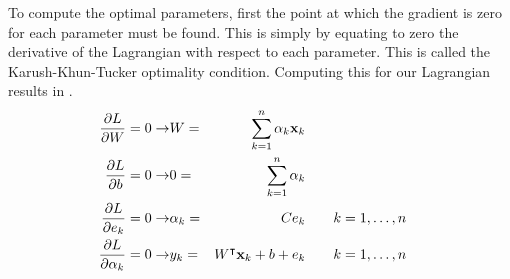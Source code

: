 To compute the optimal parameters, first the point at which the gradient is zero for each parameter must be found. This is simply by equating to zero the derivative of the Lagrangian with respect to each parameter. This is called the Karush-Khun-Tucker optimality condition. Computing this for our Lagrangian results in .
\begin{equation}
  \begin{split}
    \pdv{L}{W} = 0 \rightarrow          & W           = & \sum_{k=1}^{n}\alpha_{k}\vb{x}_{k}                      \\
    \pdv{L}{b} = 0 \rightarrow          & 0           = & \sum_{k=1}^{n}\alpha_{k}                                \\
    \pdv{L}{e_{k}} = 0 \rightarrow      & \alpha_{k}  = & C e_{k}                            & \qquad k=1,\dots,n \\
    \pdv{L}{\alpha_{k}} = 0 \rightarrow & y_{k}       = & W^{\intercal}\vb{x}_{k}+b+e_{k}    & \qquad k=1,\dots,n \\
  \end{split}\label{eq:lssvr_KKT}
\end{equation}

